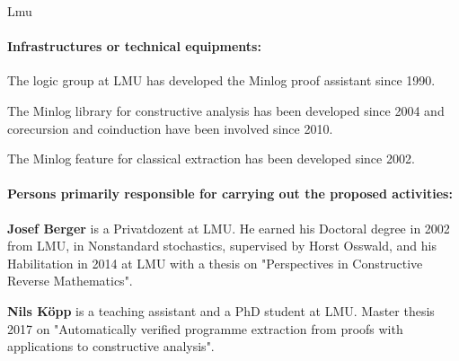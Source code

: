 \begin{sitedescription}{Lmu}

\paragraph*{Infrastructures or technical equipments:}

\begin{compactitem}
\item The logic group at LMU has developed the Minlog proof assistant since 1990.
\item The Minlog library for constructive analysis has been developed since 2004
and corecursion and coinduction have been involved since 2010.
\item The Minlog feature for classical extraction has been developed since 2002.
\end{compactitem}

\paragraph*{Persons primarily responsible for carrying out the proposed activities:}

\begin{compactitem}

\item \textbf{Josef Berger} is a Privatdozent at LMU.  He earned his
  Doctoral degree in 2002 from LMU, in Nonstandard stochastics,
  supervised by Horst Osswald, and his Habilitation in 2014 at LMU
  with a thesis on "Perspectives in Constructive Reverse Mathematics".

\item \textbf{Nils K\"opp} is a teaching assistant and a PhD student
  at LMU.  Master thesis 2017 on "Automatically verified programme
  extraction from proofs with applications to constructive analysis".


\end{compactitem}
\end{sitedescription}
